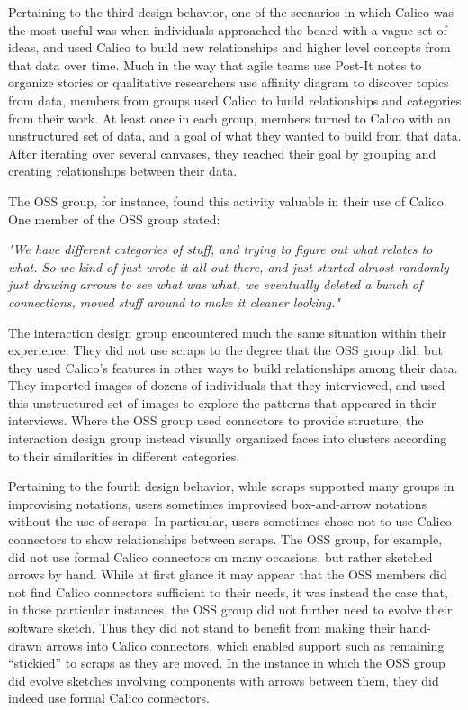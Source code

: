 \documentclass[12pt,fleqn]{ucithesis}
\begin{document}
Pertaining to the third design behavior, one of the scenarios in which Calico was the most useful was when individuals approached the board with a vague set of ideas, and used Calico to build new relationships and higher level concepts from that data over time. Much in the way that agile teams use Post-It notes to organize stories or qualitative researchers use affinity diagram to discover topics from data, members from groups used Calico to build relationships and categories from their work. At least once in each group, members turned to Calico with an unstructured set of data, and a goal of what they wanted to build from that data. After iterating over several canvases, they reached their goal by grouping and creating relationships between their data. 

The OSS group, for instance, found this activity valuable in their use of Calico. One member of the OSS group stated:

\begin{myindentpar}{1cm}
\emph{"We have different categories of stuff, and trying to figure out what relates to what. So we kind of just wrote it all out there, and just started almost randomly just drawing arrows to see what was what, we eventually deleted a bunch of connections, moved stuff around to make it cleaner looking."}
\end{myindentpar}

The interaction design group encountered much the same situation within their experience. They did not use scraps to the degree that the OSS group did, but they used Calico's features in other ways to build relationships among their data. They imported images of dozens of individuals that they interviewed, and used this unstructured set of images to explore the patterns that appeared in their interviews. Where the OSS group used connectors to provide structure, the interaction design group instead visually organized faces into clusters according to their similarities in different categories. 

Pertaining to the fourth design behavior, while scraps supported many groups in improvising notations, users sometimes improvised box-and-arrow notations without the use of scraps. In particular, users sometimes chose not to use Calico connectors to show relationships between scraps. The OSS group, for example, did not use formal Calico connectors on many occasions, but rather sketched arrows by hand. While at first glance it may appear that the OSS members did not find Calico connectors sufficient to their needs, it was instead the case that, in those particular instances, the OSS group did not further need to evolve their software sketch. Thus they did not stand to benefit from making their hand-drawn arrows into Calico connectors, which enabled support such as remaining ``stickied'' to scraps as they are moved. In the instance in which the OSS group did evolve sketches involving components with arrows between them, they did indeed use formal Calico connectors. 
\end{document}

